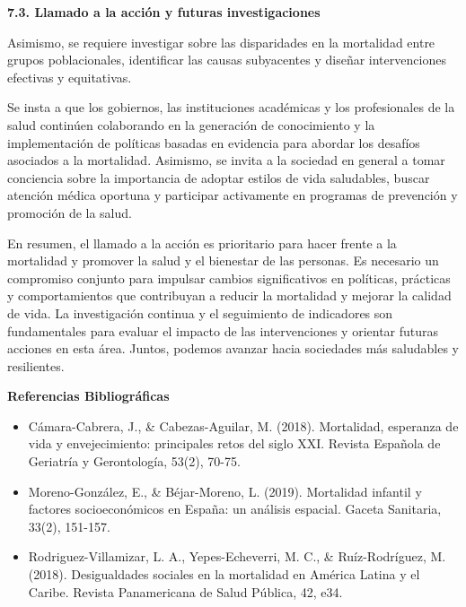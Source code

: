 \documentclass[8pt,a4paper]{beamer}
\begin{document}
{\begin{frame}{}
\begin{block}{\textbf{7.3. Llamado a la acción y futuras investigaciones}}
\end{block}
\end{frame}

\begin{frame}{}
\begin{block}{}
\setlength{\parskip}{3px}
\justifying
Asimismo, se requiere investigar sobre las disparidades en la mortalidad entre grupos poblacionales, identificar las causas subyacentes y diseñar intervenciones efectivas y equitativas.

Se insta a que los gobiernos, las instituciones académicas y los profesionales de la salud continúen colaborando en la generación de conocimiento y la implementación de políticas basadas en evidencia para abordar los desafíos asociados a la mortalidad. Asimismo, se invita a la sociedad en general a tomar conciencia sobre la importancia de adoptar estilos de vida saludables, buscar atención médica oportuna y participar activamente en programas de prevención y promoción de la salud.

En resumen, el llamado a la acción es prioritario para hacer frente a la mortalidad y promover la salud y el bienestar de las personas. Es necesario un compromiso conjunto para impulsar cambios significativos en políticas, prácticas y comportamientos que contribuyan a reducir la mortalidad y mejorar la calidad de vida. La investigación continua y el seguimiento de indicadores son fundamentales para evaluar el impacto de las intervenciones y orientar futuras acciones en esta área. Juntos, podemos avanzar hacia sociedades más saludables y resilientes.

\end{block}
\end{frame}

\begin{frame}{\textbf{Referencias Bibliográficas}}

\begin{itemize}
\justifying
\item  Cámara-Cabrera, J., \& Cabezas-Aguilar, M. (2018). Mortalidad, esperanza de vida y envejecimiento: principales retos del siglo XXI. Revista Española de Geriatría y Gerontología, 53(2), 70-75.

\item Moreno-González, E., \& Béjar-Moreno, L. (2019). Mortalidad infantil y factores socioeconómicos en España: un análisis espacial. Gaceta Sanitaria, 33(2), 151-157.

\item Rodriguez-Villamizar, L. A., Yepes-Echeverri, M. C., \& Ruíz-Rodríguez, M. (2018). Desigualdades sociales en la mortalidad en América Latina y el Caribe. Revista Panamericana de Salud Pública, 42, e34.


\end{itemize}
\end{frame}}
\end{document}
